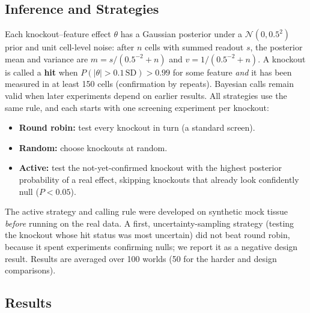 \documentclass[journal]{IEEEtran}
\begin{document}
\subsection{Inference and Strategies}
Each knockout--feature effect $\theta$ has a Gaussian posterior under a $\mathcal{N}(0, 0.5^2)$ prior and unit cell-level noise: after $n$ cells with summed readout $s$, the posterior mean and variance are $m = s/(0.5^{-2}+n)$ and $v = 1/(0.5^{-2}+n)$. A knockout is called a \textbf{hit} when $P(|\theta|>0.1\,\mathrm{SD}) > 0.99$ for some feature \emph{and} it has been measured in at least 150 cells (confirmation by repeats). Bayesian calls remain valid when later experiments depend on earlier results. All strategies use the same rule, and each starts with one screening experiment per knockout:
\begin{itemize}
  \item \textbf{Round robin:} test every knockout in turn (a standard screen).
  \item \textbf{Random:} choose knockouts at random.
  \item \textbf{Active:} test the not-yet-confirmed knockout with the highest posterior probability of a real effect, skipping knockouts that already look confidently null ($P<0.05$).
\end{itemize}
The active strategy and calling rule were developed on synthetic mock tissue \emph{before} running on the real data. A first, uncertainty-sampling strategy (testing the knockout whose hit status was most uncertain) did not beat round robin, because it spent experiments confirming nulls; we report it as a negative design result. Results are averaged over 100 worlds (50 for the harder and design comparisons).

\subsection{Results}
\end{document}
